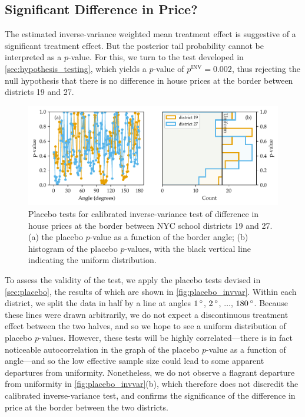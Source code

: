 \subsection{Significant Difference in Price?}
The estimated inverse-variance weighted mean treatment effect is suggestive of a significant treatment effect.
But the posterior tail probability cannot be interpreted as a \(p\)-value.
For this, we turn to the test developed in \autoref{sec:hypothesis_testing}, which yields a \(p\)-value of \(p^{\mathrm{INV}}=0.002\), thus rejecting the null hypothesis that there is no difference in house prices at the border between districts 19 and 27.

\begin{figure}[tb]
    \centering
    \includegraphics[width=\textwidth,height=0.3\textheight,keepaspectratio]{../NYC/NYC_plots/placebo_invvar.pdf}
    \caption{\label{fig:placebo_invvar} Placebo tests for calibrated inverse-variance test of difference in house prices at the border between NYC school districts 19 and 27. 
    (a) the placebo \(p\)-value as a function of the border angle;
    (b) histogram of the placebo \(p\)-values, with the black vertical line indicating the uniform distribution.}
\end{figure}

To assess the validity of the test, we apply the placebo tests devised in \autoref{sec:placebo},
the results of which are shown in \autoref{fig:placebo_invvar}.
Within each district, we split the data in half by a line at angles \(1{\,^\circ}\), \(2{\,^\circ}\), \(\dotsc\), \(180{\,^\circ}\).
Because these lines were drawn arbitrarily, we do not expect a discontinuous treatment effect between the two halves, and so we hope to see a uniform distribution of placebo \(p\)-values.
However, these tests will be highly correlated---there is in fact noticeable autocorrelation in the graph of the placebo \(p\)-value as a function of angle---and so the low effective sample size could lead to some apparent departures from uniformity.
Nonetheless, we do not observe a flagrant departure from uniformity in \autoref{fig:placebo_invvar}(b), which therefore does not discredit the calibrated inverse-variance test, and confirms the significance of the difference in price at the border between the two districts.

